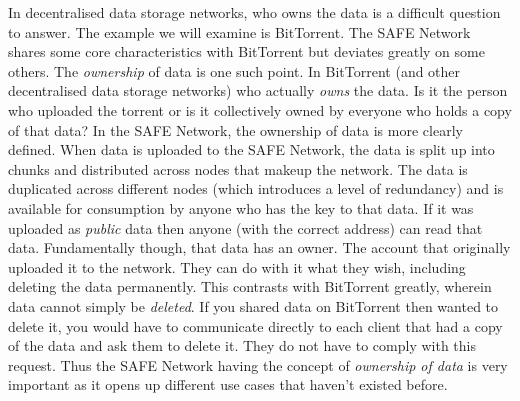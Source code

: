 \documentclass{l4proj}
\begin{document}
In decentralised data storage networks, who owns the data is a difficult question to answer. The example we will examine is BitTorrent. The SAFE Network shares some core characteristics with BitTorrent but deviates greatly on some others. The \textit{ownership} of data is one such point. In BitTorrent (and other decentralised data storage networks) who actually \textit{owns} the data. Is it the person who uploaded the torrent or is it collectively owned by everyone who holds a copy of that data? In the SAFE Network, the ownership of data is more clearly defined. When data is uploaded to the SAFE Network, the data is split up into chunks and distributed across nodes that makeup the network. The data is duplicated across different nodes (which introduces a level of redundancy) and is available for consumption by anyone who has the key to that data. If it was uploaded as \textit{public} data then anyone (with the correct address) can read that data. Fundamentally though, that data has an owner. The account that originally uploaded it to the network. They can do with it what they wish, including deleting the data permanently. This contrasts with BitTorrent greatly, wherein data cannot simply be \textit{deleted}. If you shared data on BitTorrent then wanted to delete it, you would have to communicate directly to each client that had a copy of the data and ask them to delete it. They do not have to comply with this request. Thus the SAFE Network having the concept of \textit{ownership of data} is very important as it opens up different use cases that haven't existed before.
\end{document}
